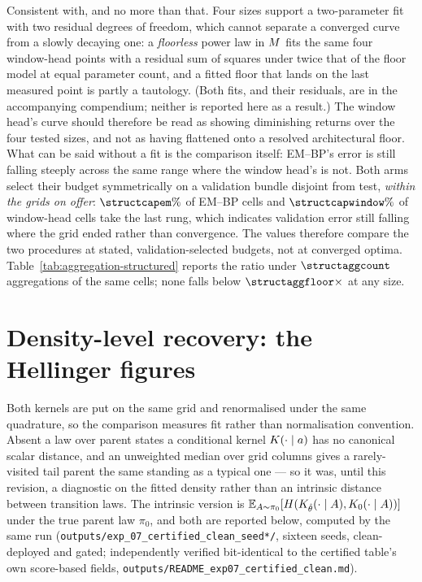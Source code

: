 Consistent with, and no more than that. Four sizes support a two-parameter fit with two residual
degrees of freedom, which cannot separate a converged curve from a slowly decaying one: a
\emph{floorless} power law in $M$ fits the same four window-head points with a residual sum of
squares under twice that of the floor model at equal parameter count, and a fitted floor that
lands on the last measured point is partly a tautology. (Both fits, and their residuals, are in
the accompanying compendium; neither is reported here as a result.) The window head's curve should therefore
be read as showing diminishing returns over the four tested sizes, and not as having flattened
onto a resolved architectural floor. What can be said without a fit is the comparison itself:
EM--BP's error is still falling steeply across the same range where the window head's is not. Both arms select their budget
symmetrically on a validation bundle disjoint from test, \emph{within the grids on offer}:
$\structcapem\%$ of EM--BP cells and $\structcapwindow\%$ of window-head cells take the last rung,
which indicates validation error still falling where the grid ended rather than convergence. The
values therefore compare the two procedures at stated, validation-selected budgets, not at
converged optima. Table~\ref{tab:aggregation-structured} reports the ratio under
$\structaggcount$ aggregations of the same cells; none falls below $\structaggfloor\times$ at any
size.

\section{Density-level recovery: the Hellinger figures}
\label{app:hellinger}

Both kernels are put on the same grid and renormalised under the same quadrature, so the
comparison measures fit rather than normalisation convention. Absent a law over parent states a
conditional kernel $K(\cdot\mid a)$ has no canonical scalar distance, and an unweighted
median over grid columns gives a rarely-visited tail parent the same standing as a typical one ---
so it was, until this revision, a diagnostic on the fitted density rather than an intrinsic
distance between transition laws. The intrinsic version is $\mathbb{E}_{A\sim\pi_0}[H(K_{\hat{\theta}}
(\cdot\mid A), K_0(\cdot\mid A))]$ under the true parent law $\pi_0$, and both are reported
below, computed by the same run (\texttt{outputs/exp\_07\_certified\_clean\_seed*/}, sixteen
seeds, clean-deployed and gated; independently verified bit-identical to the certified table's
own score-based fields, \texttt{outputs/README\_exp07\_certified\_clean.md}).

